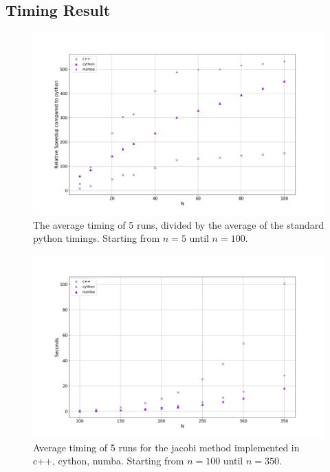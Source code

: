 \subsection{Timing Result}

\begin{figure}[H]
  \centering
  \includegraphics[width=1.0\textwidth]{../figures/avgspeed.png}
  \caption{ The average timing of 5 runs, divided by the average of the standard
  python timings. Starting from $n=5$ until $n=100$. }
  \label{fig:comp_python}
\end{figure}

\begin{figure}[H]
  \centering
  \includegraphics[width=1.0\textwidth]{../figures/speedComp_100_350.png}
  \caption{Average timing of 5 runs for the jacobi method implemented in c++, cython, numba. Starting from $n=100$ until $n=350$.}
  \label{fig:timing_largeN}
\end{figure}

